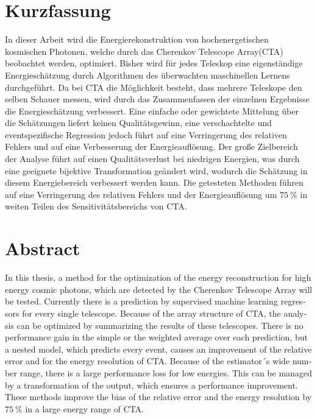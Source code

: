 \thispagestyle{plain}

\section*{Kurzfassung}
In dieser Arbeit wird die Energierekonstruktion von hochenergetischen kosmischen Photonen, welche durch das Cherenkov Telescope Array(CTA) beobachtet
werden, optimiert.
Bisher wird für jedes Teleskop eine eigenständige Energieschätzung durch Algorithmen des überwachten maschinellen Lernens durchgeführt.
Da bei CTA die Möglichkeit besteht, dass mehrere Teleskope den selben Schauer messen, wird durch das Zusammenfassen der einzelnen Ergebnisse die
Energieschätzung verbessert.
Eine einfache oder gewichtete Mittelung über die Schätzungen liefert keinen Qualitätsgewinn, eine verschachtelte und eventspezifische Regression jedoch
führt auf eine Verringerung des relativen Fehlers und auf eine Verbesserung der Energieauflösung.
Der große Zielbereich der Analyse führt auf einen Qualitätsverlust bei niedrigen Energien, was durch eine geeignete bijektive Transformation
geändert wird, wodurch die Schätzung in diesem Energiebereich verbessert werden kann.
Die getesteten Methoden führen auf eine Verringerung des relativen Fehlers und der Energieauflösung um $\SI{75}{\percent}$ in weiten Teilen des Sensitivitätsbereichs von CTA.

\section*{Abstract}
\begin{english}
In this thesis, a method for the optimization of the energy reconstruction for high energy cosmic photons, which are detected by the Cherenkov Telescope Array will be tested.
Currently there is a prediction by supervised machine learning regressors for every single telescope.
Because of the array structure of CTA, the analysis can be optimized by summarizing the results of these telescopes.
There is no performance gain in the simple or the weighted average over each prediction, but a nested model, which predicts every event, causes an improvement
of the relative error and for the energy resolution of CTA.
Because of the estimator´s wide number range, there is a large performance loss for low energies.
This can be managed by a transformation of the output, which ensures a performance improvement.
These methods improve the bias of the relative error and the energy resolution by $\SI{75}{\percent}$ in a large energy range of CTA.
\end{english}
